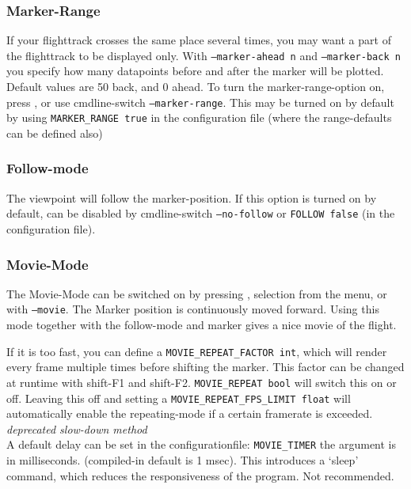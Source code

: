 \subsubsection{Marker-Range}

If your flighttrack crosses the same place several times, you may want a part of
the flighttrack to be displayed only. With \texttt{--marker-ahead n}  and \texttt{--marker-back n}
you specify how many datapoints before and after the marker will be plotted. Default values are
50 back, and 0 ahead. To turn the marker-range-option on, press , or use
cmdline-switch \texttt{--marker-range}. This may be turned on by default by using
\texttt{MARKER\_RANGE true} in the configuration file (where the range-defaults can be defined
also)

\subsubsection{Follow-mode}

The viewpoint will follow the marker-position. If this option is turned on by
default, can be disabled by cmdline-switch \texttt{--no-follow} or \texttt{FOLLOW false} (in  the configuration file).


\subsubsection{Movie-Mode}
\label{movie}
The Movie-Mode can be switched on by pressing , selection from the menu, or with \texttt{--movie}.
The Marker position is continuously moved forward.
Using this mode together with the follow-mode and marker gives a nice movie of the flight.

If it is too fast, you can define a \texttt{MOVIE\_REPEAT\_FACTOR int}, which will render every frame multiple times before shifting the marker. This factor can be changed at runtime with shift-F1 and shift-F2.
\texttt{MOVIE\_REPEAT bool} will switch this on or off. Leaving this off and setting a \texttt{MOVIE\_REPEAT\_FPS\_LIMIT float} will  automatically enable the repeating-mode if a certain framerate is exceeded. \\

\emph{deprecated slow-down method} \\
A default delay can be set in the configurationfile:
\texttt{MOVIE\_TIMER} the argument is in milliseconds. (compiled-in default is 1 msec).
This introduces a `sleep' command, which reduces the responsiveness of the program. Not recommended.
